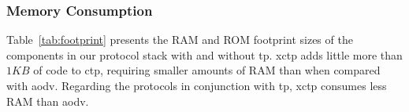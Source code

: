 \subsubsection{Memory Consumption}
\label{sec:memory-consumption}


Table~\ref{tab:footprint} presents the RAM and ROM footprint sizes
 of the components in our protocol stack with and
without \ac{tp}. \ac{xctp} adds little more than $1KB$ of code to
\ac{ctp}, requiring smaller amounts of RAM than when compared with
\ac{aodv}. Regarding the protocols in conjunction with \ac{tp},
\ac{xctp} consumes less RAM than \ac{aodv}.


